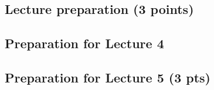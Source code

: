 \documentclass{article}
\begin{document}
\begin{enumerate}
\section{Lecture preparation (3 points)}

\subsection{Preparation for Lecture 4}

\subsection{Preparation for Lecture 5 (3 pts)}

\end{enumerate}
\end{document}
